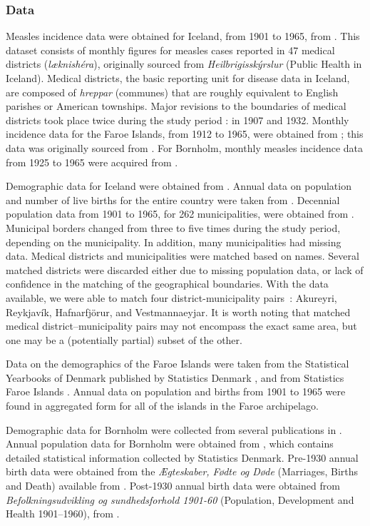 \documentclass[10pt]{article}
\begin{document}
\subsubsection*{Data}

Measles incidence data were obtained for Iceland, from 1901 to 1965, from \cite{Cliff1981}. This dataset consists of monthly figures for measles cases reported in 47 medical districts (\textit{l\ae knish\'{e}ra\dh{}}), originally sourced from \textit{Heilbrig\dh{}issk\'{y}rslur} (Public Health in Iceland). Medical districts, the basic reporting unit for disease data in Iceland, are composed of \textit{hreppar} (communes) that are roughly equivalent to English parishes or American townships. Major revisions to the boundaries of medical districts took place twice during the study period : in 1907 and 1932. Monthly incidence data for the Faroe Islands, from 1912 to 1965, were obtained from \cite{Cliff2000}; this data was originally sourced from \cite{Lancaster1990}. For Bornholm, monthly measles incidence data from 1925 to 1965 were acquired from \cite{Kingdom}.

Demographic data for Iceland were obtained from \cite{StatsIceland}. Annual data on population and number of live births for the entire country were taken from \cite{StatsIcelandBirths}. Decennial population data from 1901 to 1965, for 262 municipalities, were obtained from \cite{StatsIcelandPop}. Municipal borders changed from three to five times during the study period, depending on the municipality. In addition, many municipalities had missing data. Medical districts and municipalities were matched based on names. Several matched districts were discarded either due to missing population data, or lack of confidence in the matching of the geographical boundaries. With the data available, we were able to match four district-municipality pairs~: Akureyri, Reykjav\'{i}k, Hafnarfj\"{o}r\dh{}ur, and Vestmannaeyjar. It is worth noting that matched medical district--municipality pairs may not encompass the exact same area, but one may be a (potentially partial) subset of the other. 

Data on the demographics of the Faroe Islands were taken from the Statistical Yearbooks of Denmark published by Statistics Denmark \cite{StatsDenmark}, and from Statistics Faroe Islands \cite{StatsFaroe}. Annual data on population and births from 1901 to 1965 were found in aggregated form for all of the islands in the Faroe archipelago. 

Demographic data for Bornholm were collected from several publications in \cite{StatsDenmark}. Annual population data for Bornholm were obtained from \cite{StatsDenmarkPop}, which contains detailed statistical information collected by Statistics Denmark. Pre-1930 annual birth data were obtained from the \textit{\AE{}gteskaber, F\o{}dte og D\o{}de} (Marriages, Births and Death) available from \cite{StatsDenmarkBirths1}. Post-1930 annual birth data were obtained from \textit{Befolkningsudvikling og sundhedsforhold 1901-60} (Population, Development and Health 1901--1960), from \cite{StatsDenmarkBirths2}.
\end{document}
